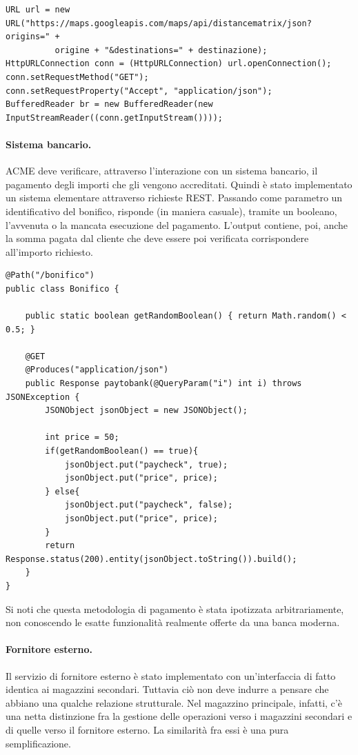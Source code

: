 \documentclass[twoside]{article}
\begin{document}
\begin{lstlisting}
URL url = new URL("https://maps.googleapis.com/maps/api/distancematrix/json?origins=" + 		
	      origine + "&destinations=" + destinazione);
HttpURLConnection conn = (HttpURLConnection) url.openConnection();
conn.setRequestMethod("GET");
conn.setRequestProperty("Accept", "application/json");		
BufferedReader br = new BufferedReader(new InputStreamReader((conn.getInputStream())));
\end{lstlisting}

\paragraph{Sistema bancario.}
ACME deve verificare, attraverso l'interazione con un sistema bancario, il pagamento degli importi
che gli vengono accreditati. Quindi è stato implementato un sistema elementare attraverso richieste REST.
Passando come parametro un identificativo del bonifico, risponde (in maniera casuale), tramite
un booleano, l'avvenuta o la mancata esecuzione del pagamento.
L'output contiene, poi, anche la somma pagata dal cliente che deve essere poi verificata
corrispondere all'importo richiesto.
 
\begin{lstlisting}
@Path("/bonifico")
public class Bonifico {
	
	public static boolean getRandomBoolean() { return Math.random() < 0.5; }
		
	@GET
	@Produces("application/json")
	public Response paytobank(@QueryParam("i") int i) throws JSONException {
		JSONObject jsonObject = new JSONObject();
		
		int price = 50;
		if(getRandomBoolean() == true){
			jsonObject.put("paycheck", true);
			jsonObject.put("price", price);
		} else{
			jsonObject.put("paycheck", false);
			jsonObject.put("price", price);
		}
		return Response.status(200).entity(jsonObject.toString()).build();
	}
}
\end{lstlisting}

Si noti che questa metodologia di pagamento è stata ipotizzata arbitrariamente,
non conoscendo le esatte funzionalità realmente offerte da una banca moderna.

\paragraph{Fornitore esterno.}
Il servizio di fornitore esterno è stato implementato con un'interfaccia di fatto
identica ai magazzini secondari. Tuttavia ciò non deve indurre a pensare che abbiano
una qualche relazione strutturale. Nel magazzino principale, infatti, c'è una netta
distinzione fra la gestione delle operazioni verso i magazzini secondari e di quelle
verso il fornitore esterno. La similarità fra essi è una pura semplificazione.
\end{document}
